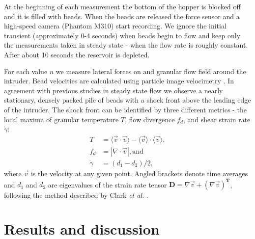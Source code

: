 At the beginning of each measurement the bottom of the hopper is blocked off and it is filled with beads. When the beads are released the force sensor and a high-speed camera (Phantom M310) start recording. We ignore the initial transient (approximately 0-4 seconds) when beads begin to flow and keep only the measurements taken in steady state - when the flow rate is roughly constant.  After about 10 seconds the reservoir is depleted.

For each value $n$ we measure lateral forces on and granular flow field around the intruder. Bead velocities are calculated using particle image velocimetry \cite{thielicke_pivlab_2014}. In agreement with previous studies \cite{amarouchene_dynamic_2001, wassgren_dilute_2003, knoll_numerical_2007, boudet_shock_2008, meyer_transient_2013, vilquin_structure_2016} in steady state flow we observe a nearly stationary, densely packed pile of beads with a shock front above the leading edge of the intruder. The shock front can be identified by three different metrics - the local maxima of granular temperature $T$, flow divergence $f_d$, and shear strain rate $\dot\gamma$: 
\begin{align} 
T &= \langle \vec{v}\cdot \vec{v} \rangle - \langle\vec{v} \rangle \cdot \langle\vec{v} \rangle, \label{gTemp}\\ 
f_d &= | \nabla\cdot\vec{v}|, \textrm{and} \label{flowDiv}\\ 
\dot{\gamma} &= (d_{1}-d_{2})/2 \label{shearRate}, 
\end{align}
where $\vec{v}$ is the velocity at any given point. Angled brackets denote time averages and $d_{1}$ and $d_{2}$ are eigenvalues of the strain rate tensor $\textbf{D}=\nabla \vec{v}+(\nabla \vec{v})^{\textbf{T}}$, following the method described by Clark \textit{et al.} \cite{clark_steady_2016}. 

\section{Results and discussion}

